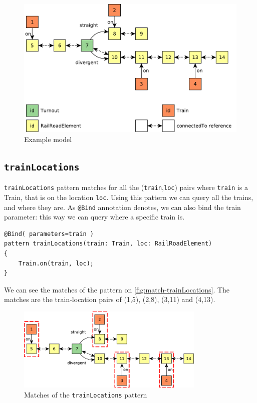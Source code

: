 \begin{figure}[H]
	\begin{center}
		\includegraphics[width=\textwidth]{figures/query-example-model.pdf}
		\caption{Example model}
		\label{fig:query-example-model}
	\end{center}
\end{figure}

\subsection{\texttt{trainLocations}}
\begin{minipage}{\textwidth}

\texttt{trainLocations} pattern matches for all the (\texttt{train},\texttt{loc}) pairs where \texttt{train} is a Train, that is on the location \texttt{loc}.
Using this pattern we can query all the trains, and where they are.
As \texttt{@Bind} annotation denotes, we can also bind the train parameter: this way we can query where a specific train is.
\begin{lstlisting}[language = vql]
@Bind( parameters=train )
pattern trainLocations(train: Train, loc: RailRoadElement)
{
	Train.on(train, loc);
}
\end{lstlisting}
We can see the matches of the pattern on \autoref{fig:match-trainLocations}. The matches are the train-location pairs of (1,5), (2,8), (3,11) and (4,13).
\begin{figure}[H]
	\begin{center}
		\includegraphics[width=0.8\textwidth]{figures/query-example-model-trainloc.pdf}
	\end{center}
	\caption{Matches of the \texttt{trainLocations} pattern}
	\label{fig:match-trainLocations}
\end{figure}

\end{minipage}




